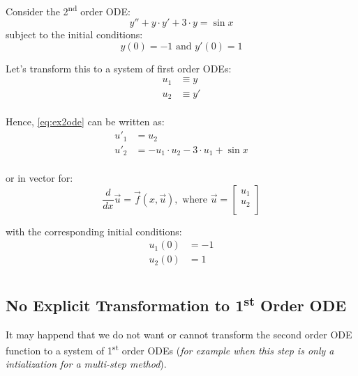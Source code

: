 \documentclass[12pt,a4paper,twoside]{report}
\begin{document}
Consider the 2\textsuperscript{nd} order ODE:
\begin{equation}
  \label{eq:ex2ode}
  y'' + y \cdot y' + 3 \cdot y = \sin x
\end{equation}
subject to the initial conditions:
\begin{equation}
  y(0) = -1 \text{  and  } y'(0) = 1
\end{equation}

Let's transform this to a system of first order ODEs:
\begin{equation}
  \begin{aligned}
    u_1 & \equiv y   \\
    u_2 & \equiv y'  \\
  \end{aligned}
\end{equation}

Hence, \ref{eq:ex2ode} can be written as:
\begin{equation}
  \begin{aligned}
    u'_1 & = u_2 \\
    u'_2 & = - u_1 \cdot u_2 - 3 \cdot u_1 + \sin x \\
  \end{aligned}
\end{equation}

or in vector for:
\begin{equation}
  \frac{d}{dx} \vec{u} = 
  \vec{f} ( x, \vec{u} ) , 
  \text{ where } 
  \vec{u} = \begin{bmatrix} 
    u_1 \\
    u_2 \\
  \end{bmatrix}
\end{equation}

with the corresponding initial conditions:
\begin{equation}
  \begin{aligned}
    u_1 (0) & = -1 \\
    u_2 (0) & = 1 \\
  \end{aligned}
\end{equation}

\subsection{No Explicit Transformation to 1\textsuperscript{st} Order ODE}
It may happend that we do not want or cannot transform the second order ODE function 
to a system of 1\textsuperscript{st} order ODEs (\textit{for example when this step 
is only a intialization for a multi-step method}).
\end{document}
